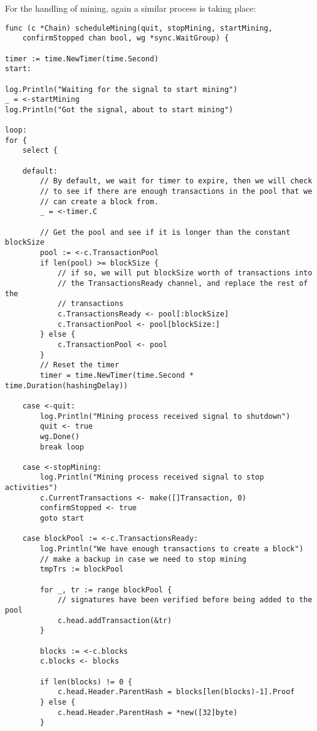 \documentclass[a4paper,12pt]{article}
\begin{document}
For the handling of mining, again a similar process is taking place:
\begin{Verbatim}[obeytabs,tabsize=4]
func (c *Chain) scheduleMining(quit, stopMining, startMining,
    confirmStopped chan bool, wg *sync.WaitGroup) {

timer := time.NewTimer(time.Second)
start:

log.Println("Waiting for the signal to start mining")
_ = <-startMining
log.Println("Got the signal, about to start mining")

loop:
for {
    select {

    default:
        // By default, we wait for timer to expire, then we will check
        // to see if there are enough transactions in the pool that we
        // can create a block from.
        _ = <-timer.C

        // Get the pool and see if it is longer than the constant blockSize
        pool := <-c.TransactionPool
        if len(pool) >= blockSize {
            // if so, we will put blockSize worth of transactions into
            // the TransactionsReady channel, and replace the rest of the
            // transactions
            c.TransactionsReady <- pool[:blockSize]
            c.TransactionPool <- pool[blockSize:]
        } else {
            c.TransactionPool <- pool
        }
        // Reset the timer
        timer = time.NewTimer(time.Second * time.Duration(hashingDelay))

    case <-quit:
        log.Println("Mining process received signal to shutdown")
        quit <- true
        wg.Done()
        break loop

    case <-stopMining:
        log.Println("Mining process received signal to stop activities")
        c.CurrentTransactions <- make([]Transaction, 0)
        confirmStopped <- true
        goto start

    case blockPool := <-c.TransactionsReady:
        log.Println("We have enough transactions to create a block")
        // make a backup in case we need to stop mining
        tmpTrs := blockPool

        for _, tr := range blockPool {
            // signatures have been verified before being added to the pool
            c.head.addTransaction(&tr)
        }

        blocks := <-c.blocks
        c.blocks <- blocks

        if len(blocks) != 0 {
            c.head.Header.ParentHash = blocks[len(blocks)-1].Proof
        } else {
            c.head.Header.ParentHash = *new([32]byte)
        }


\end{Verbatim}
\end{document}

